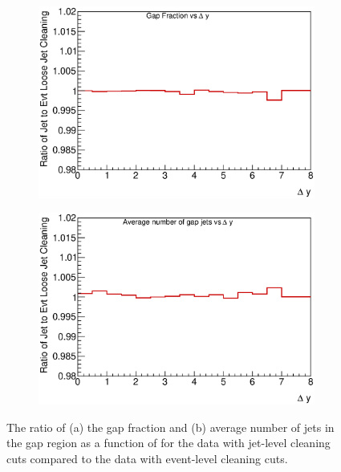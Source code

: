 \begin{figure}
\centering
        \begin{subfigure}[b]{0.5\textwidth}
                \centering
                \includegraphics[width=\textwidth]{figures/GBJ2/jetcleaning/Clean___GapFraction_deltaY_Ratio_Loose_JetEvt_Data.eps}
        \end{subfigure}%
        \begin{subfigure}[b]{0.5\textwidth}
                \centering
                \includegraphics[width=\textwidth]{figures/GBJ2/jetcleaning/Clean___prof_deltaY_njets_Ratio_Loose_JetEvt_Data.eps}
        \end{subfigure}%
\caption[Comparison between event and jet level cleaning cuts on the gap fraction and average number of jets]{
The ratio of (a) the gap fraction and (b) average number of jets in the gap region as a function of \dy{} for the data with jet-level cleaning cuts compared to the data with event-level cleaning cuts.
\label{GBJ2:JetCleaning:gap}}
\end{figure}


